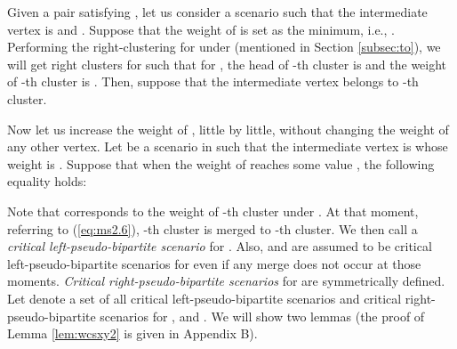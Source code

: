 \documentclass[a4paper]{llncs}
\begin{document}
Given a pair  satisfying ,
let us consider a scenario  
such that the intermediate vertex is  and .
Suppose that the weight of  is set as the minimum, i.e., .
Performing the right-clustering for  under  (mentioned in Section \ref{subsec:to}), 
we will get right clusters for  such that 
for ,
the head of -th cluster is 
and the weight of -th cluster is .
Then, suppose that the intermediate vertex  belongs to -th cluster.


Now let us increase the weight of , little by little, without changing the weight of any other vertex.
Let 
 be a scenario in  such that the intermediate vertex is  whose weight is .
Suppose that when the weight of  reaches some value , the following equality holds:

Note that  corresponds to the weight of -th cluster under .
At that moment, referring to (\ref{eq:ms2.6}), -th cluster is merged to -th cluster.
We then call  a {\it critical left-pseudo-bipartite scenario} for .
Also, 
 and  are assumed to be critical left-pseudo-bipartite scenarios for 
even if any merge does not occur at those moments.
{\it Critical right-pseudo-bipartite scenarios} for  are symmetrically defined.
Let  denote a set of all critical left-pseudo-bipartite scenarios and critical right-pseudo-bipartite scenarios for ,
and .
We will show two lemmas
(the proof of Lemma \ref{lem:wcsxy2} is given in Appendix B).
\end{document}
